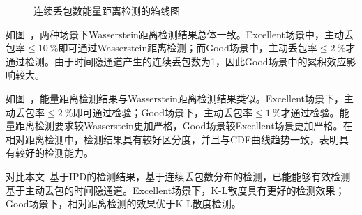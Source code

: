 {	\begin{figure}[htb]
        \centering
        \caption{连续丢包数能量距离检测的箱线图}
        \label{fig:3:result:burst:ed}
	\end{figure}
}

如图\ ，两种场景下Wasserstein距离检测结果总体一致。Excellent场景中，主动丢包率$\le 10\ \%$即可通过Wasserstein距离检测；而Good场景中，主动丢包率$\le 2\ \%$才通过检测。由于时间隐通道产生的连续丢包数为1，因此Good场景中的累积效应影响较大。

如图\ ，能量距离检测结果与Wasserstein距离检测结果类似。Excellent场景下，主动丢包率$\le 2\ \%$即可通过检验；Good场景下，主动丢包率$\le 1\ \%$才通过检验。能量距离检测要求较Wasserstein更加严格，Good场景较Excellent场景更加严格。在相对距离检测中，检测结果具有较好区分度，并且与CDF曲线趋势一致，表明具有较好的检测能力。

对比本文\ 基于IPD的检测结果，基于连续丢包数分布的检测，已能能够有效检测基于主动丢包的时间隐通道。Excellent场景下，K-L散度具有更好的检测效果；Good场景下，相对距离检测的效果优于K-L散度检测。

